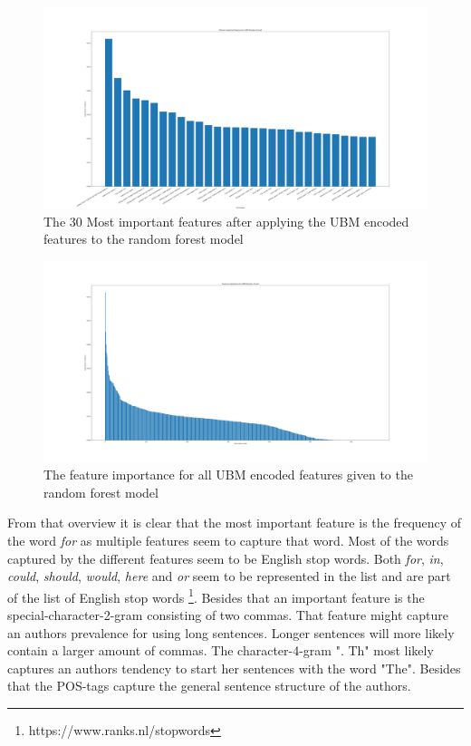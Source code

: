 \begin{landscape}
    \begin{figure}
        \centering
        \includegraphics[scale=.26]{./pictures/FeatureImpotrance30.png}
        \caption{The 30 Most important features after applying the UBM encoded
        features to the random forest model}
        \label{fig:feature_importance_small}
    \end{figure}
\end{landscape}


\begin{landscape}
    \begin{figure}
        \centering
        \includegraphics[scale=.26]{./pictures/FeatureImpotranceAll.png}
        \caption{The feature importance for all UBM encoded features given
        to the random forest model}
        \label{fig:feature_importance_all}
    \end{figure}
\end{landscape}


From that overview it is clear that the most important feature is the frequency
of the word \textit{for} as multiple features seem to capture that word. Most
of the words captured by the different features seem to be English stop words.
Both \textit{for}, \textit{in}, \textit{could}, \textit{should}, \textit{would},
\textit{here} and \textit{or} seem to be represented in the list and are part
of the list of English stop words \footnote{https://www.ranks.nl/stopwords}.
Besides that an important feature is the special-character-2-gram consisting
of two commas. That feature might capture an authors prevalence for using long
sentences. Longer sentences will more likely contain a larger amount of commas.
The character-4-gram ". Th" most likely captures an authors tendency to start
her sentences with the word "The". Besides that the \gls{POS}-tags capture the
general sentence structure of the authors.

